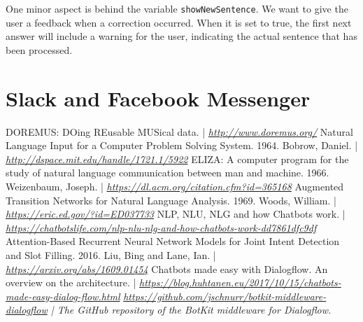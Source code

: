 \documentclass[a4paper,12pt]{report}
\begin{document}
	One minor aspect is behind the variable \texttt{showNewSentence}. We want to give the user a feedback when a correction occurred. When it is set to true, the first next answer will include a warning for the user, indicating the actual sentence that has been processed.
	
	\section{Slack and Facebook Messenger}
	
	\begin{thebibliography}{9}
		 DOREMUS: DOing REusable MUSical data. | \textit{\href{http://www.doremus.org/}{http://www.doremus.org/}}
		 Natural Language Input for a Computer Problem Solving System. 1964. Bobrow, Daniel. | \textit{\href{http://dspace.mit.edu/handle/1721.1/5922}{http://dspace.mit.edu/handle/1721.1/5922}}
		 ELIZA: A computer program for the study of natural language communication between man and machine. 1966. Weizenbaum, Joseph. | \textit{\href{https://dl.acm.org/citation.cfm?id=365168}{https://dl.acm.org/citation.cfm?id=365168}}
		 Augmented Transition Networks for Natural Language Analysis. 1969. Woods, William. | \textit{\href{https://eric.ed.gov/?id=ED037733}{https://eric.ed.gov/?id=ED037733}}
		 NLP, NLU, NLG and how Chatbots work. | \textit{\href{https://chatbotslife.com/nlp-nlu-nlg-and-how-chatbots-work-dd7861dfc9df}{https://chatbotslife.com/nlp-nlu-nlg-and-how-chatbots-work-dd7861dfc9df}}
		 Attention-Based Recurrent Neural Network Models for Joint Intent Detection and Slot Filling. 2016. Liu, Bing and Lane, Ian. | \textit{\href{https://arxiv.org/abs/1609.01454}{https://arxiv.org/abs/1609.01454}}
		 Chatbots made easy with Dialogflow. An overview on the architecture. | \textit{\href{https://blog.huhtanen.eu/2017/10/15/chatbots-made-easy-dialog-flow.html}{https://blog.huhtanen.eu/2017/10/15/chatbots-made-easy-dialog-flow.html}}
		\textit{\href{https://github.com/jschnurr/botkit-middleware-dialogflow}{https://github.com/jschnurr/botkit-middleware-dialogflow} | The GitHub repository of the BotKit middleware for Dialogflow.}
	\end{thebibliography}
\end{document}
